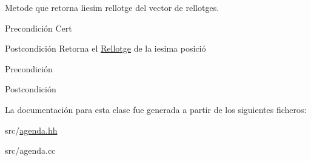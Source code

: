 Metode que retorna l\textquotesingle{}iesim rellotge del vector de rellotges. 

\begin{DoxyPrecond}{Precondición}
Cert 
\end{DoxyPrecond}
\begin{DoxyPostcond}{Postcondición}
Retorna el \hyperlink{class_rellotge}{Rellotge} de la iesima posició
\end{DoxyPostcond}
\begin{DoxyPrecond}{Precondición}

\end{DoxyPrecond}
\begin{DoxyPostcond}{Postcondición}

\end{DoxyPostcond}


La documentación para esta clase fue generada a partir de los siguientes ficheros\+:\begin{DoxyCompactItemize}
\item 
src/\hyperlink{agenda_8hh}{agenda.\+hh}\item 
src/agenda.\+cc\end{DoxyCompactItemize}
